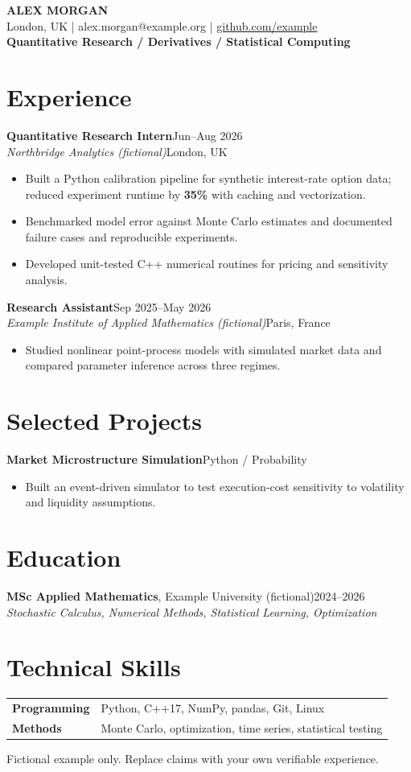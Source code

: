 \documentclass[10pt,a4paper]{article}
\newcommand{\role}[4]{\textbf{#1}\hfill\textcolor{muted}{#2}\\[-0.5pt]\textit{#3}\hfill\textcolor{muted}{#4}\vspace{1pt}}
\begin{document}
{\fontsize{18}{21}\selectfont\bfseries\color{ink} ALEX MORGAN}\\[4pt]
{\small\color{muted} London, UK \quad | \quad alex.morgan@example.org \quad | \quad
\href{https://github.com/example}{github.com/example}}\\[3pt]
{\small\color{accent}\bfseries Quantitative Research \quad / \quad Derivatives \quad / \quad Statistical Computing}
\section{Experience}
\role{Quantitative Research Intern}{Jun--Aug 2026}{Northbridge Analytics (fictional)}{London, UK}
\begin{itemize}
\item Built a Python calibration pipeline for synthetic interest-rate option data; reduced experiment runtime by \textbf{35\%} with caching and vectorization.
\item Benchmarked model error against Monte Carlo estimates and documented failure cases and reproducible experiments.
\item Developed unit-tested C++ numerical routines for pricing and sensitivity analysis.
\end{itemize}
\role{Research Assistant}{Sep 2025--May 2026}{Example Institute of Applied Mathematics (fictional)}{Paris, France}
\begin{itemize}
\item Studied nonlinear point-process models with simulated market data and compared parameter inference across three regimes.
\end{itemize}
\section{Selected Projects}
\textbf{Market Microstructure Simulation}\hfill\textcolor{muted}{Python / Probability}
\begin{itemize}
\item Built an event-driven simulator to test execution-cost sensitivity to volatility and liquidity assumptions.
\end{itemize}
\section{Education}
\textbf{MSc Applied Mathematics}, Example University (fictional)\hfill\textcolor{muted}{2024--2026}\\
\textit{Stochastic Calculus, Numerical Methods, Statistical Learning, Optimization}
\section{Technical Skills}
\begin{tabularx}{\linewidth}{@{}l X@{}}
\textbf{Programming} & Python, C++17, NumPy, pandas, Git, Linux \\
\textbf{Methods} & Monte Carlo, optimization, time series, statistical testing \\
\end{tabularx}
\vfill
{\footnotesize\color{muted} Fictional example only. Replace claims with your own verifiable experience.}
\end{document}
